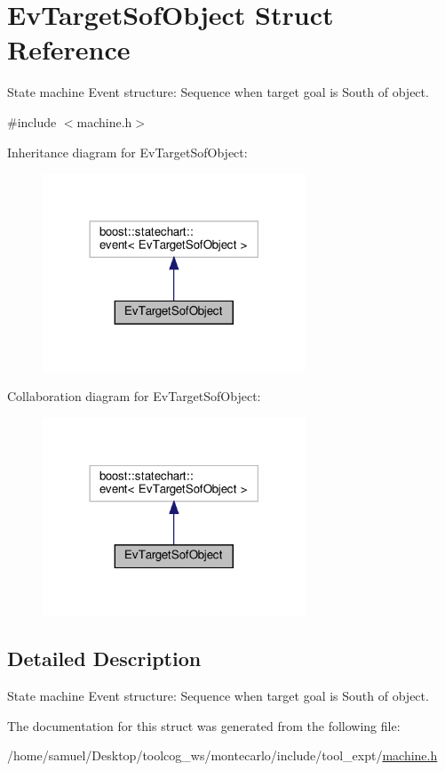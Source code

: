 \hypertarget{structEvTargetSofObject}{}\section{Ev\+Target\+Sof\+Object Struct Reference}
\label{structEvTargetSofObject}


State machine Event structure\+: Sequence when target goal is South of object.  




{\ttfamily \#include $<$machine.\+h$>$}



Inheritance diagram for Ev\+Target\+Sof\+Object\+:
\nopagebreak
\begin{figure}[H]
\begin{center}
\leavevmode
\includegraphics[width=222pt]{structEvTargetSofObject__inherit__graph}
\end{center}
\end{figure}


Collaboration diagram for Ev\+Target\+Sof\+Object\+:
\nopagebreak
\begin{figure}[H]
\begin{center}
\leavevmode
\includegraphics[width=222pt]{structEvTargetSofObject__coll__graph}
\end{center}
\end{figure}


\subsection{Detailed Description}
State machine Event structure\+: Sequence when target goal is South of object. 

The documentation for this struct was generated from the following file\+:\begin{DoxyCompactItemize}
\item 
/home/samuel/\+Desktop/toolcog\+\_\+ws/montecarlo/include/tool\+\_\+expt/\hyperlink{machine_8h}{machine.\+h}\end{DoxyCompactItemize}

